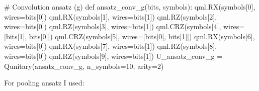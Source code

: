\documentclass[
  13pt,
  a4paper,
  DIV=11,
  numbers=noendperiod]{scrreprt}
\newenvironment{Shaded}{\begin{snugshade}}{\end{snugshade}}
\newcommand{\CommentTok}[1]{\textcolor[rgb]{0.37,0.37,0.37}{#1}}
\newcommand{\DecValTok}[1]{\textcolor[rgb]{0.68,0.00,0.00}{#1}}
\newcommand{\KeywordTok}[1]{\textcolor[rgb]{0.00,0.23,0.31}{#1}}
\newcommand{\NormalTok}[1]{\textcolor[rgb]{0.00,0.23,0.31}{#1}}
\newcommand{\OperatorTok}[1]{\textcolor[rgb]{0.37,0.37,0.37}{#1}}
\begin{document}
\begin{Shaded}
\begin{Highlighting}[]
\CommentTok{\# Convolution ansatz (g) }
\KeywordTok{def}\NormalTok{ ansatz\_conv\_g(bits, symbols):}
\NormalTok{    qml.RX(symbols[}\DecValTok{0}\NormalTok{], wires}\OperatorTok{=}\NormalTok{bits[}\DecValTok{0}\NormalTok{])}
\NormalTok{    qml.RX(symbols[}\DecValTok{1}\NormalTok{], wires}\OperatorTok{=}\NormalTok{bits[}\DecValTok{1}\NormalTok{])}
\NormalTok{    qml.RZ(symbols[}\DecValTok{2}\NormalTok{], wires}\OperatorTok{=}\NormalTok{bits[}\DecValTok{0}\NormalTok{])}
\NormalTok{    qml.RZ(symbols[}\DecValTok{3}\NormalTok{], wires}\OperatorTok{=}\NormalTok{bits[}\DecValTok{1}\NormalTok{])}
\NormalTok{    qml.CRZ(symbols[}\DecValTok{4}\NormalTok{], wires}\OperatorTok{=}\NormalTok{[bits[}\DecValTok{1}\NormalTok{], bits[}\DecValTok{0}\NormalTok{]])}
\NormalTok{    qml.CRZ(symbols[}\DecValTok{5}\NormalTok{], wires}\OperatorTok{=}\NormalTok{[bits[}\DecValTok{0}\NormalTok{], bits[}\DecValTok{1}\NormalTok{]])}
\NormalTok{    qml.RX(symbols[}\DecValTok{6}\NormalTok{], wires}\OperatorTok{=}\NormalTok{bits[}\DecValTok{0}\NormalTok{])}
\NormalTok{    qml.RX(symbols[}\DecValTok{7}\NormalTok{], wires}\OperatorTok{=}\NormalTok{bits[}\DecValTok{1}\NormalTok{])}
\NormalTok{    qml.RZ(symbols[}\DecValTok{8}\NormalTok{], wires}\OperatorTok{=}\NormalTok{bits[}\DecValTok{0}\NormalTok{])}
\NormalTok{    qml.RZ(symbols[}\DecValTok{9}\NormalTok{], wires}\OperatorTok{=}\NormalTok{bits[}\DecValTok{1}\NormalTok{])}
\NormalTok{U\_ansatz\_conv\_g }\OperatorTok{=}\NormalTok{ Qunitary(ansatz\_conv\_g, n\_symbols}\OperatorTok{=}\DecValTok{10}\NormalTok{, arity}\OperatorTok{=}\DecValTok{2}\NormalTok{)}
\end{Highlighting}
\end{Shaded}

For pooling ansatz I used:
\end{document}
